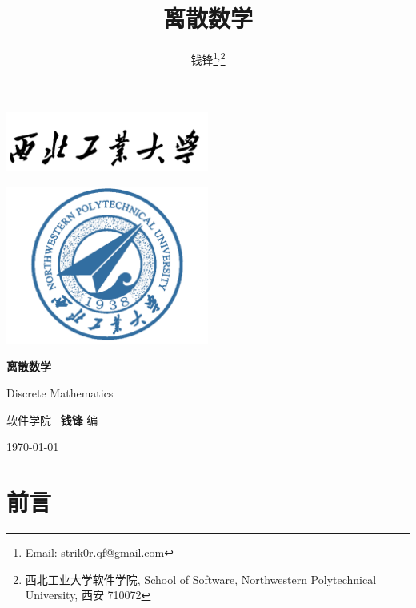 \documentclass[10pt,UTF8]{book} %
\title{\textbf{离散数学}}
\author{钱锋\thanks{Email: strik0r.qf@gmail.com}${}^,$\thanks{
    西北工业大学软件学院, School of Software, Northwestern Polytechnical University, 西安 710072
}}
\begin{document}
\everymath{\displaystyle}


\pagestyle{empty}
\begin{titlepage}
    \thispagestyle{empty}
    \centering
        \vspace*{2cm}
        \includegraphics[width=0.5\textwidth]{pic/npu_2.png}\par
        \vspace{1em}
        \includegraphics[width=0.5\textwidth]{pic/npu_1.png}\par
    \vspace{1em}
        \begin{center}
            \Huge \heiti \textbf{离散数学}

            Discrete Mathematics
        \end{center}
        \vspace{17em}
        \begin{center}
        \songti
        \kaishu 软件学院 \, \heiti\textbf{钱锋} \quad \songti 编
        \vspace{0.5em}

    \today
    \end{center}
\end{titlepage}
\cleardoublepage
\maketitle
\cleardoublepage

\frontmatter
\newpage
\pagestyle{plain}
\makeatother


\chapter{前言}
\thispagestyle{empty}
\end{document}
